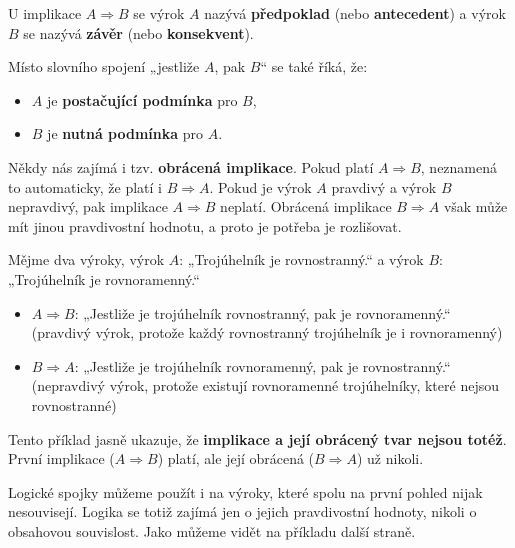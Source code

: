 \documentclass[12pt,a4paper]{article}
\begin{document}
\begin{notebox}
    U implikace $A \Rightarrow B$ se výrok $A$ nazývá \textbf{předpoklad} (nebo \textbf{antecedent})  
    a výrok $B$ se nazývá \textbf{závěr} (nebo \textbf{konsekvent}).  

    Místo slovního spojení „jestliže $A$, pak $B$“ se také říká, že:  
    \begin{itemize}
        \item $A$ je \textbf{postačující podmínka} pro $B$,  
        \item $B$ je \textbf{nutná podmínka} pro $A$.
    \end{itemize}
\end{notebox}

    Někdy nás zajímá i tzv. \textbf{obrácená implikace}.  
    Pokud platí $A \Rightarrow B$, neznamená to automaticky, že platí i $B \Rightarrow A$.  
    Pokud je výrok $A$ pravdivý a výrok $B$ nepravdivý, pak implikace $A \Rightarrow B$ neplatí.  
    Obrácená implikace $B \Rightarrow A$ však může mít jinou pravdivostní hodnotu, a proto je potřeba je rozlišovat.

\begin{examplebox}
    Mějme dva výroky, výrok $A$: „Trojúhelník je rovnostranný.“ a výrok $B$: „Trojúhelník je rovnoramenný.“

\begin{itemize}
    \item $A \Rightarrow B$: „Jestliže je trojúhelník rovnostranný, pak je rovnoramenný.“  
          \hfill (pravdivý výrok, protože každý rovnostranný trojúhelník je i rovnoramenný)
    \item $B \Rightarrow A$: „Jestliže je trojúhelník rovnoramenný, pak je rovnostranný.“  
          \hfill (nepravdivý výrok, protože existují rovnoramenné trojúhelníky, které nejsou rovnostranné)
\end{itemize}

Tento příklad jasně ukazuje, že \textbf{implikace a její obrácený tvar nejsou totéž}.  
První implikace ($A \Rightarrow B$) platí, ale její obrácená ($B \Rightarrow A$) už nikoli.
\end{examplebox}

Logické spojky můžeme použít i na výroky, které spolu na první pohled nijak nesouvisejí.  
    Logika se totiž zajímá jen o jejich pravdivostní hodnoty, nikoli o obsahovou souvislost. Jako můžeme vidět na příkladu další straně. \newpage
\end{document}
